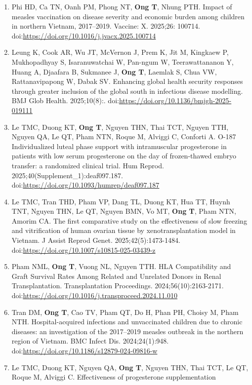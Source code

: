 \documentclass[
  12pt,
  a4paper,
]{article}
\begin{document}
\begin{enumerate}
\item
  Phi HD, Ca TN, Oanh PM, Phong NT, \textbf{Ong T}, Nhung PTH. Impact of
  measles vaccination on disease severity and economic burden among
  children in northern Vietnam, 2017--2019. Vaccine: X. 2025;26: 100714.
  doi:\url{https://doi.org/10.1016/j.jvacx.2025.100714}
\item
  Leung K, Cook AR, Wu JT, McVernon J, Prem K, Jit M, Kingkaew P,
  Mukhopadhyay S, Isaranuwatchai W, Pan-ngum W, Teerawattananon Y, Huang
  A, Djaafara B, Sukmanee J, \textbf{Ong T}, Laemlak S, Chua VW,
  Rattanavipapong W, Dabak SV. Enhancing global health security
  responses through greater inclusion of the global south in infectious
  disease modelling. BMJ Glob Health. 2025;10(8):.
  doi:\url{https://doi.org/10.1136/bmjgh-2025-019111}
\item
  Le TMC, Duong KT, \textbf{Ong T}, Nguyen THN, Thai TCT, Nguyen TTH,
  Nguyen QA, Le QT, Pham NTN, Roque M, Alviggi C, Conforti A. O-187
  Individualized luteal phase support with intramuscular progesterone in
  patients with low serum progesterone on the day of frozen-thawed
  embryo transfer: a randomized clinical trial. Hum Reprod.
  2025;40(Supplement\_1):deaf097.187.
  doi:\url{https://doi.org/10.1093/humrep/deaf097.187}
\item
  Le TMC, Tran THD, Pham VP, Dang TL, Duong KT, Hua TT, Huynh TNT,
  Nguyen THN, Le QT, Nguyen BMN, Vo MT, \textbf{Ong T}, Pham NTN, Amorim
  CA. The first comparative study on the effectiveness of slow freezing
  and vitrification of human ovarian tissue by xenotransplantation model
  in Vietnam. J Assist Reprod Genet. 2025;42(5):1473-1484.
  doi:\url{https://doi.org/10.1007/s10815-025-03439-z}
\item
  Pham NML, \textbf{Ong T}, Vuong NL, Nguyen TTH. HLA Compatibility and
  Graft Survival Rates Among Related and Unrelated Donors in Renal
  Transplantation. Transplantation Proceedings. 2024;56(10):2163-2171.
  doi:\url{https://doi.org/10.1016/j.transproceed.2024.11.010}
\item
  Tran DM, \textbf{Ong T}, Cao TV, Pham QT, Do H, Phan PH, Choisy M,
  Pham NTH. Hospital-acquired infections and unvaccinated children due
  to chronic diseases: an investigation of the 2017--2019 measles
  outbreak in the northern region of Vietnam. BMC Infect Dis.
  2024;24(1):948. doi:\url{https://doi.org/10.1186/s12879-024-09816-w}
\item
  Le TMC, Duong KT, Nguyen QA, \textbf{Ong T}, Nguyen THN, Thai TCT, Le
  QT, Roque M, Alviggi C. Effectiveness of progesterone supplementation

\end{enumerate}
\end{document}
